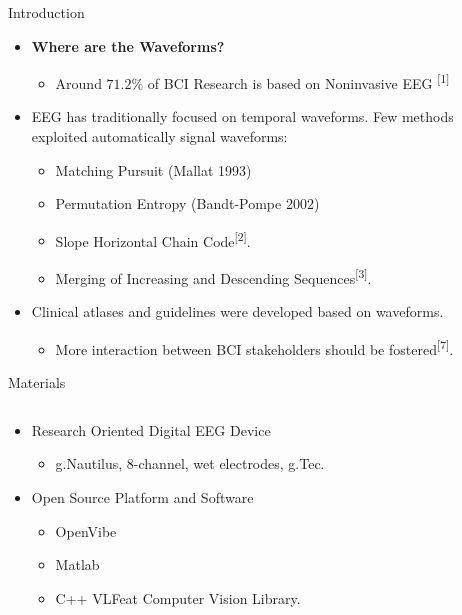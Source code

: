 \documentclass[final,hyperref={pdfpagelabels=false}]{beamer}
\begin{document}
\begin{frame}[t]
\begin{columns}[t]
\begin{column}{.465\textwidth}
\begin{block}{Introduction}
\begin{itemize}
\item \textbf{Where are the Waveforms?}
\begin{itemize}
\item Around $71.2\%$ of BCI Research is based on Noninvasive EEG \textsuperscript{[1]}
\end{itemize}
\item EEG has traditionally focused on temporal waveforms. Few methods exploited automatically signal waveforms:
\begin{itemize}
\item Matching Pursuit (Mallat 1993)
\item Permutation Entropy (Bandt-Pompe 2002)
\item Slope Horizontal Chain Code\textsuperscript{[2]}.
\item Merging of Increasing and Descending Sequences\textsuperscript{[3]}.
\end{itemize}
\item Clinical atlases and guidelines were developed based on waveforms.   
\begin{itemize}
\item More interaction between BCI stakeholders should be fostered\textsuperscript{[7]}.
\end{itemize}
\end{itemize}

\end{block}


\begin{block}{Materials}

\begin{columns} %
\begin{column}{.54\textwidth} %
\begin{itemize}
\item Research Oriented Digital EEG Device
\begin{itemize}
\item g.Nautilus, 8-channel, wet electrodes, g.Tec.
\end{itemize}
\item Open Source Platform and Software
\begin{itemize}
\item OpenVibe
\item Matlab
\item C++ VLFeat Computer Vision Library.
\end{itemize}


\end{itemize}
\end{column}
\end{columns}
\end{block}
\end{column}
\end{columns}
\end{frame}
\end{document}
